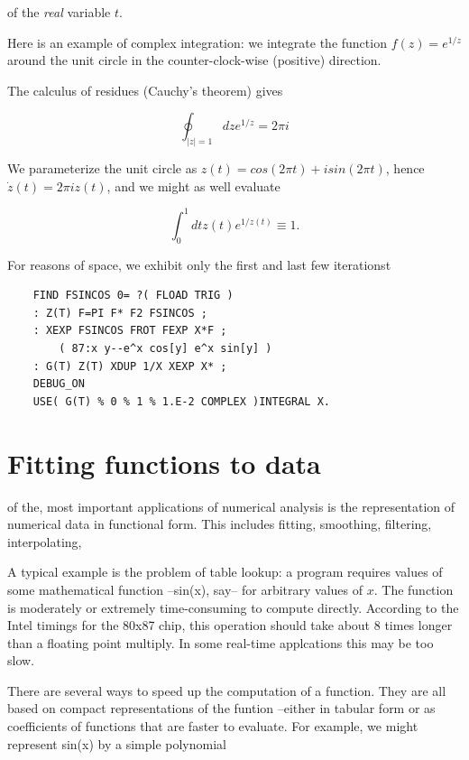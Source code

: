 of the \textit{real} variable $t$.

Here is an example of complex integration: we integrate the function $f(z) = e^{1/z}$ around the unit circle in the counter-clock-wise (positive) direction.

The calculus of residues (Cauchy's theorem) gives

\begin{equation}
\oint_{ \vert z \vert =1} dz e^{1/z} = 2\pi i
\end{equation}

We parameterize the unit circle as $z(t) = cos(2\pi t) + i sin(2\pi t)$, hence $\dot{z}(t) = 2\pi iz(t)$, and we might as well evaluate

\begin{equation}
\int_{0}^{1} dt z(t) e^{1/z(t)} \equiv 1.
\end{equation}

For reasons of space, we exhibit only the first and last few iterationst

\begin{lstlisting}
    FIND FSINCOS 0= ?( FLOAD TRIG )
    : Z(T) F=PI F* F2 FSINCOS ;
    : XEXP FSINCOS FROT FEXP X*F ;
        ( 87:x y--e^x cos[y] e^x sin[y] )
    : G(T) Z(T) XDUP 1/X XEXP X* ;
    DEBUG_ON
    USE( G(T) % 0 % 1 % 1.E-2 COMPLEX )INTEGRAL X.
\end{lstlisting}




\section{Fitting functions to data}
 of the, most important applications of numerical analysis is the representation of numerical data in functional form. This includes fitting, smoothing, filtering, interpolating, \etc

A typical example is the problem of table lookup: a program requires values of some mathematical function --sin(x), say-- for arbitrary values of $x$. The function is moderately or extremely time-consuming to compute directly. According to the Intel timings for the 80x87 chip, this operation should take about 8 times longer than a floating point multiply. In some real-time applcations this may be too slow.

There are several ways to speed up the computation of a function. They are all based on compact representations of the funtion --either in tabular form or as coefficients of functions that are faster to evaluate. For example, we might represent sin(x) by a simple polynomial

